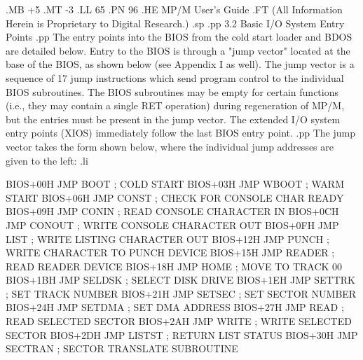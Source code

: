 .MB +5
.MT -3
.LL 65
.PN 96
.HE MP/M User's Guide
.FT   (All Information Herein is Proprietary to Digital Research.)
.sp
.pp
3.2 Basic I/O System Entry Points
.pp
The entry points into the BIOS from the cold start loader and BDOS are
detailed below.  Entry to the BIOS is through a "jump vector" located at
the base of the BIOS, as shown below (see Appendix I as well).
The jump vector is a sequence of 17 jump
instructions which send program control to the individual BIOS
subroutines.  The BIOS subroutines may be empty for certain functions
(i.e., they may contain a single RET operation) during regeneration of
MP/M, but the entries must be present in the jump vector.
The extended I/O system entry points (XIOS) immediately follow the
last BIOS entry point.
.pp
The jump vector takes the form shown below, where the
individual jump addresses are given to the left:
.li

   BIOS+00H    JMP BOOT         ; COLD START
   BIOS+03H    JMP WBOOT        ; WARM START
   BIOS+06H    JMP CONST        ; CHECK FOR CONSOLE CHAR READY
   BIOS+09H    JMP CONIN        ; READ CONSOLE CHARACTER IN
   BIOS+0CH    JMP CONOUT       ; WRITE CONSOLE CHARACTER OUT
   BIOS+0FH    JMP LIST         ; WRITE LISTING CHARACTER OUT
   BIOS+12H    JMP PUNCH        ; WRITE CHARACTER TO PUNCH DEVICE
   BIOS+15H    JMP READER       ; READ READER DEVICE
   BIOS+18H    JMP HOME         ; MOVE TO TRACK 00
   BIOS+1BH    JMP SELDSK       ; SELECT DISK DRIVE
   BIOS+1EH    JMP SETTRK       ; SET TRACK NUMBER
   BIOS+21H    JMP SETSEC       ; SET SECTOR NUMBER
   BIOS+24H    JMP SETDMA       ; SET DMA ADDRESS
   BIOS+27H    JMP READ         ; READ SELECTED SECTOR
   BIOS+2AH    JMP WRITE        ; WRITE SELECTED SECTOR
   BIOS+2DH    JMP LISTST       ; RETURN LIST STATUS
   BIOS+30H    JMP SECTRAN      ; SECTOR TRANSLATE SUBROUTINE

